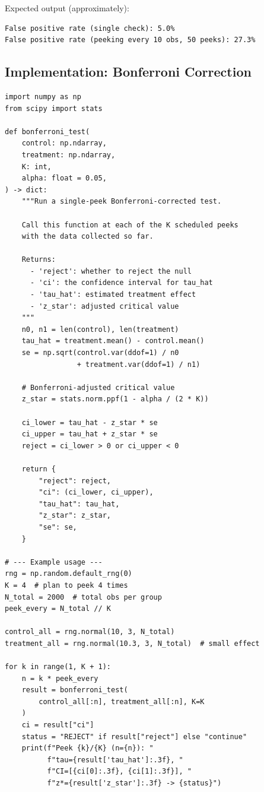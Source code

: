 \documentclass[12pt, a4paper]{article}
\begin{document}
\begin{plainlanguage}
Expected output (approximately):
\begin{verbatim}
False positive rate (single check): 5.0%
False positive rate (peeking every 10 obs, 50 peeks): 27.3%
\end{verbatim}
\end{plainlanguage}


\subsection{Implementation: Bonferroni Correction}

\begin{lstlisting}
import numpy as np
from scipy import stats

def bonferroni_test(
    control: np.ndarray,
    treatment: np.ndarray,
    K: int,
    alpha: float = 0.05,
) -> dict:
    """Run a single-peek Bonferroni-corrected test.

    Call this function at each of the K scheduled peeks
    with the data collected so far.

    Returns:
      - 'reject': whether to reject the null
      - 'ci': the confidence interval for tau_hat
      - 'tau_hat': estimated treatment effect
      - 'z_star': adjusted critical value
    """
    n0, n1 = len(control), len(treatment)
    tau_hat = treatment.mean() - control.mean()
    se = np.sqrt(control.var(ddof=1) / n0
                 + treatment.var(ddof=1) / n1)

    # Bonferroni-adjusted critical value
    z_star = stats.norm.ppf(1 - alpha / (2 * K))

    ci_lower = tau_hat - z_star * se
    ci_upper = tau_hat + z_star * se
    reject = ci_lower > 0 or ci_upper < 0

    return {
        "reject": reject,
        "ci": (ci_lower, ci_upper),
        "tau_hat": tau_hat,
        "z_star": z_star,
        "se": se,
    }

# --- Example usage ---
rng = np.random.default_rng(0)
K = 4  # plan to peek 4 times
N_total = 2000  # total obs per group
peek_every = N_total // K

control_all = rng.normal(10, 3, N_total)
treatment_all = rng.normal(10.3, 3, N_total)  # small effect

for k in range(1, K + 1):
    n = k * peek_every
    result = bonferroni_test(
        control_all[:n], treatment_all[:n], K=K
    )
    ci = result["ci"]
    status = "REJECT" if result["reject"] else "continue"
    print(f"Peek {k}/{K} (n={n}): "
          f"tau={result['tau_hat']:.3f}, "
          f"CI=[{ci[0]:.3f}, {ci[1]:.3f}], "
          f"z*={result['z_star']:.3f} -> {status}")
\end{lstlisting}
\end{document}
